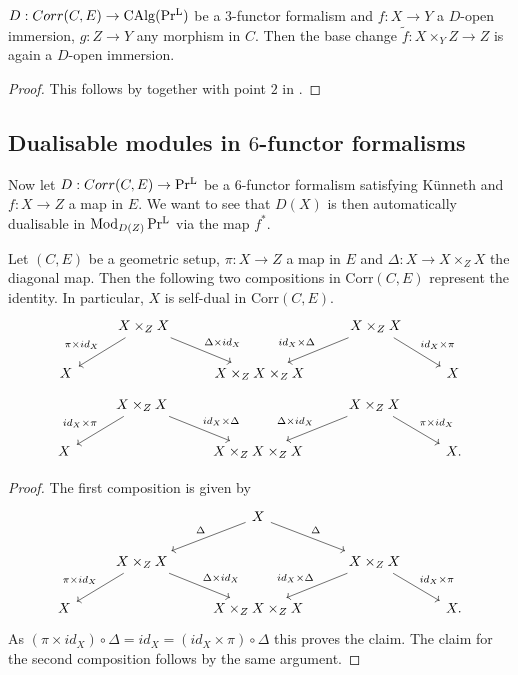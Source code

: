 \begin{corollary}\label{bc for open immersions}
 $D: Corr(C,E) \to \operatorname{CAlg}(\operatorname{Pr^{L}})$ be a $3$-functor formalism and  $f: X \to Y$ a $D$-open immersion, $g: Z \to Y$ any morphism in $C$. Then the base change $\tilde{f}: X \times_Y Z \to Z$ is again a $D$-open immersion.
\end{corollary}
\begin{proof}
    This follows by  together with point $2$ in .
\end{proof}

\subsection{Dualisable modules in $6$-functor formalisms}\label{Dualisable modules in $6$-functor formalisms}
Now let $D : Corr(C,E) \to \operatorname{Pr^{L}}$ be a $6$-functor formalism satisfying Künneth and $f: X \to Z$ a map in $E$. We want to see that $D(X)$ is then automatically dualisable in $\operatorname{Mod}_{D(Z)}\operatorname{Pr^{L}}$ via the map $f^*$.

\begin{lemma}\label{funnydiagrams}
Let $(C,E)$ be a geometric setup,  $\pi : X \to Z$ a map in $E$ and $\Delta : X \to X\times_Z X$ the diagonal map. Then the following two compositions  in $\mathrm{Corr}(C,E)$ represent the identity. In particular, $X$ is self-dual in $\mathrm{Corr}(C,E)$.
\[\begin{tikzcd}
	& {X\times_Z X} & {} & {X\times_Z X} \\
	X && {X\times_Z X \times_Z X} & {} & X
	\arrow["{\Delta\times id_X}", from=1-2, to=2-3]
	\arrow["{\pi\times id_X}"', from=1-2, to=2-1]
	\arrow["{id_X \times \Delta}"', from=1-4, to=2-3]
	\arrow["{id_X \times \pi}", from=1-4, to=2-5]
\end{tikzcd}\]
\[\begin{tikzcd}
	& {X\times_Z X} & {} & {X\times_Z X} \\
	X && {X \times_Z X \times_Z X} & {} & X.
	\arrow["{id_X \times \Delta}", from=1-2, to=2-3]
	\arrow["{\Delta \times id_X }"', from=1-4, to=2-3]
	\arrow["{\pi \times id_X}", from=1-4, to=2-5]
	\arrow["{id_X \times \pi}"', from=1-2, to=2-1]
\end{tikzcd}\]

\end{lemma}
\begin{proof}
The first composition is given by 
\[\begin{tikzcd}
	&& X \\
	& {X\times_Z X} & {} & {X\times_Z X} \\
	X && {X\times_Z X \times_Z X} & {} & X.
	\arrow["{\Delta\times id_X}", from=2-2, to=3-3]
	\arrow["{id_X \times \Delta}"', from=2-4, to=3-3]
	\arrow["{id_X \times \pi}", from=2-4, to=3-5]
	\arrow["{\pi\times id_X}"', from=2-2, to=3-1]
	\arrow["\Delta"', from=1-3, to=2-2]
	\arrow["\Delta", from=1-3, to=2-4]
\end{tikzcd}\]
As $(\pi \times id_X)\circ \Delta=id_X= (id_X \times \pi)\circ \Delta$ this proves the claim. The claim for the second composition follows by the same argument.
\end{proof}

